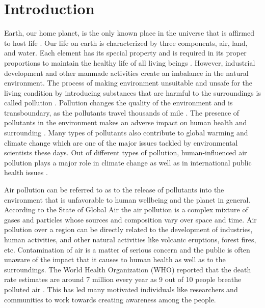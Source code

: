 \chapter{Introduction}
\setcounter{page}{1}




Earth, our home planet, is the only known place in the universe that is affirmed to host life  \cite{daly2007introduction}. Our life on earth is characterized by three components, air, land, and water. Each element has its special property and is required in its proper proportions to maintain the healthy life of all living beings \cite{daly2007introduction}. %
However, industrial development and other manmade activities create an imbalance in the natural environment. The process of making environment unsuitable and unsafe for the living condition by introducing substances that are harmful to the surroundings is called pollution \cite{manisalidis2020environmental}. Pollution changes the quality of the environment and is transboundary, as the pollutants travel thousands of mile \cite{daly2007introduction}. The presence of pollutants in the environment makes an adverse impact on human health and surrounding \cite{ritter1995persistent}. Many types of pollutants also contribute to global warming and climate change which are one of the major issues tackled by environmental scientists these days. Out of different types of pollution, human-influenced air pollution plays a major role in climate change as well as in international public health issues \cite{manisalidis2020environmental}.
 

  

 Air pollution can be referred to as to the release of pollutants into the environment that is unfavorable to human wellbeing and the planet in general. According to the State of Global Air \cite{HealthEffectsInstitute2017}  the air pollution is a complex mixture of gases and particles whose sources and composition vary over space and time. 
  Air pollution over a region can be directly related to the development of industries, human activities, and other natural activities like volcanic eruptions, forest fires, etc. Contamination of air is a matter of serious concern and the public is often unaware of the impact that it causes to human health as well as to the surroundings. The World Health Organization (WHO) reported that the death rate estimates are around 7 million every year as 9 out of 10 people breathe polluted air \cite{Wolman1985}. This has led many motivated individuals like researchers and communities to work towards creating awareness among the people.
 
